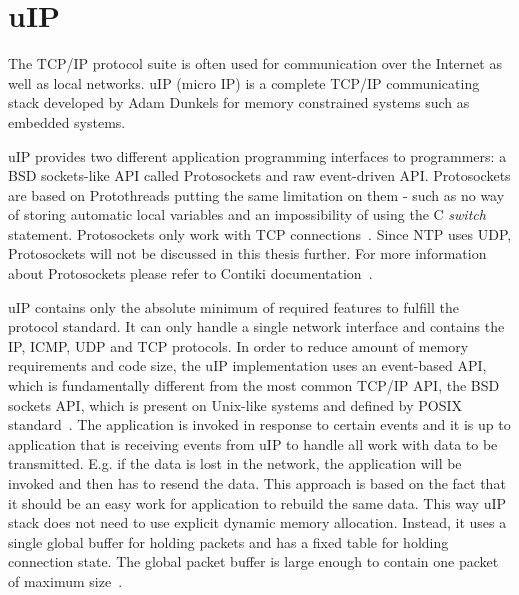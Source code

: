 
\section{uIP}\label{sec:contiki-uip}
The TCP/IP protocol suite is often used for communication over the Internet as well as local networks.
uIP (micro IP) is a complete TCP/IP communicating stack developed by Adam Dunkels
for memory constrained systems such as embedded systems.


uIP provides two different application programming interfaces to programmers:
a BSD sockets-like API called Protosockets and raw event-driven API.
Protosockets are based on Protothreads putting the same limitation on them - such as 
no way of storing automatic local variables and an impossibility of using the C {\it switch} statement.
Protosockets only work with TCP connections~\cite{contiki-docs}.
Since NTP uses UDP, Protosockets will not be
discussed in this thesis further. For more information about Protosockets
please refer to Contiki documentation~\cite{contiki-docs}.

uIP contains only the absolute minimum of required features to fulfill the protocol standard.
It can only handle a single network interface and contains the IP, ICMP, UDP and TCP protocols.
In order to reduce amount of memory requirements and code size,
the uIP implementation uses an event-based API, which is fundamentally different
from the most common TCP/IP API, the BSD sockets API, which is present on Unix-like systems
and defined by POSIX standard~\cite{thesis-programming,posix}.
The application is invoked in response to certain events and
it is up to application that is receiving events from uIP to handle all
work with data to be transmitted. E.g. if the data is lost in the network,
the application will be invoked and then has to resend the data.
This approach is based on the fact that it should be an easy work for application
to rebuild the same data.
This way uIP stack does not need to use explicit dynamic memory allocation.
Instead, it uses a single global buffer for holding packets and has a fixed
table for holding connection state.
The global packet buffer is large enough to contain one packet of maximum size~\cite{contiki-docs}.


